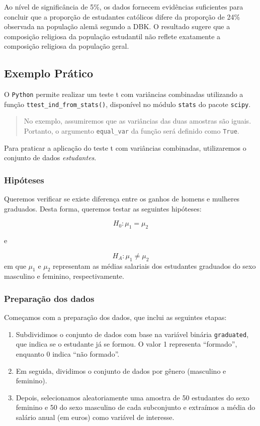 \documentclass[
  letterpaper,
  DIV=11,
  numbers=noendperiod]{scrreprt}
\begin{document}
Ao nível de significância de 5\%, os dados fornecem evidências
suficientes para concluir que a proporção de estudantes católicos difere
da proporção de 24\% observada na população alemã segundo a DBK. O
resultado sugere que a composição religiosa da população estudantil não
reflete exatamente a composição religiosa da população geral.

\subsection{Exemplo Prático}\label{exemplo-pruxe1tico}

O \texttt{Python} permite realizar um teste t com variâncias combinadas
utilizando a função \texttt{ttest\_ind\_from\_stats()}, disponível no
módulo \texttt{stats} do pacote \texttt{scipy}.

\begin{quote}
No exemplo, assumiremos que as variâncias das duas amostras são iguais.
Portanto, o argumento \texttt{equal\_var} da função será definido como
\texttt{True}.
\end{quote}

Para praticar a aplicação do teste t com variâncias combinadas,
utilizaremos o conjunto de dados \emph{estudantes}.

\subsubsection{Hipóteses}\label{hipuxf3teses}

Queremos verificar se existe diferença entre os ganhos de homens e
mulheres graduados. Desta forma, queremos testar as seguintes hipóteses:

\[H_0: \mu_1 = \mu_2\]

e

\[H_A: \mu_1 \neq \mu_2\] em que \(\mu_1\) e \(\mu_2\) representam as
médias salariais dos estudantes graduados do sexo masculino e feminino,
respectivamente.

\subsubsection{Preparação dos dados}\label{preparauxe7uxe3o-dos-dados}

Começamos com a preparação dos dados, que inclui as seguintes etapas:

\begin{enumerate}
\def\labelenumi{\arabic{enumi}.}
\item
  Subdividimos o conjunto de dados com base na variável binária
  \texttt{graduated}, que indica se o estudante já se formou. O valor 1
  representa ``formado'', enquanto 0 indica ``não formado''.
\item
  Em seguida, dividimos o conjunto de dados por gênero (masculino e
  feminino).
\item
  Depois, selecionamos aleatoriamente uma amostra de 50 estudantes do
  sexo feminino e 50 do sexo masculino de cada subconjunto e extraímos a
  média do salário anual (em euros) como variável de interesse.
\end{enumerate}
\end{document}
